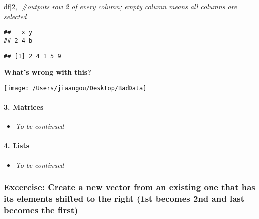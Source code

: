 \documentclass[]{article}
\newenvironment{Shaded}{\begin{snugshade}}{\end{snugshade}}
\newcommand{\DecValTok}[1]{\textcolor[rgb]{0.00,0.00,0.81}{{#1}}}
\newcommand{\CommentTok}[1]{\textcolor[rgb]{0.56,0.35,0.01}{\textit{{#1}}}}
\newcommand{\NormalTok}[1]{{#1}}
\providecommand{\tightlist}{%
  \setlength{\itemsep}{0pt}\setlength{\parskip}{0pt}}
\let\oldparagraph\paragraph
\renewcommand{\paragraph}[1]{\oldparagraph{#1}\mbox{}}
\begin{document}
\begin{Shaded}
\begin{Highlighting}[]
\NormalTok{df[}\DecValTok{2}\NormalTok{,] }\CommentTok{#outputs row 2 of every column; empty column means all columns are selected}
\end{Highlighting}
\end{Shaded}

\begin{verbatim}
##   x y
## 2 4 b
\end{verbatim}

\begin{Shaded}
\end{Shaded}

\begin{verbatim}
## [1] 2 4 1 5 9
\end{verbatim}

\newpage

\textbf{What's wrong with this?}

\begin{center}\texttt{[image: /Users/jiaangou/Desktop/BadData]} \end{center}

\paragraph{3. Matrices}\label{matrices}

\begin{itemize}
\tightlist
\item
  \emph{To be continued}
\end{itemize}

\paragraph{4. Lists}\label{lists}

\begin{itemize}
\tightlist
\item
  \emph{To be continued}
\end{itemize}

\subsubsection{Excercise: Create a new vector from an existing one that
has its elements shifted to the right (1st becomes 2nd and last becomes
the
first)}\label{excercise-create-a-new-vector-from-an-existing-one-that-has-its-elements-shifted-to-the-right-1st-becomes-2nd-and-last-becomes-the-first}
\end{document}

